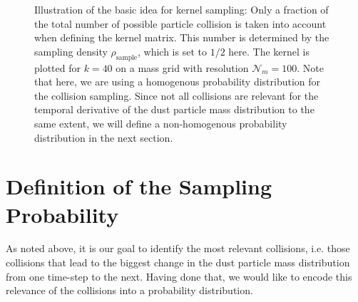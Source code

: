 \begin{figure}[h!]
    \centering
    \begin{minipage}{.5\linewidth}
        \centering
    \end{minipage}%
    \begin{minipage}{.5\linewidth}
        \centering
    \end{minipage}
    \begin{minipage}{.5\linewidth}
        \centering
    \end{minipage}%
    \begin{minipage}{.5\linewidth}
        \centering
    \end{minipage}
    \caption{
        Illustration of the basic idea for kernel sampling: Only a fraction of the total
        number of possible particle collision is taken into account when defining the 
        kernel matrix. This number is determined by the sampling density $\rho_\text{sample}$,
        which is set to $1/2$ here. 
        The kernel is plotted for $k=40$ on a mass grid with resolution $\mathcal N_m=100$.
        Note that here, we are using a homogenous probability distribution for the collision 
        sampling. Since not all collisions are relevant for the temporal derivative of the 
        dust particle mass distribution to the same extent, we will define a non-homogenous
        probability distribution in the next section.
    }
    \label{fig:sampled_kernel_homogenous_probability}
\end{figure} 

\clearpage\section{Definition of the Sampling Probability}
\label{sec:definition_of_the_sampling_probability}

    As noted above, it is our goal to identify the most relevant collisions, i.e. those collisions 
    that lead to the biggest change in the dust particle mass distribution from one time-step to 
    the next.
    Having done that, we would like to encode this relevance of the collisions into a probability
    distribution. \\

